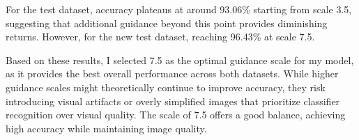 \documentclass[a4paper,twocolumn]{article}
\begin{document}
For the test dataset, accuracy plateaus at around 93.06\% starting from scale 3.5, suggesting that additional guidance beyond this point provides diminishing returns. However, for the new test dataset, reaching 96.43\% at scale 7.5.

Based on these results, I selected 7.5 as the optimal guidance scale for my model, as it provides the best overall performance across both datasets. While higher guidance scales might theoretically continue to improve accuracy, they risk introducing visual artifacts or overly simplified images that prioritize classifier recognition over visual quality. The scale of 7.5 offers a good balance, achieving high accuracy while maintaining image quality.


\printbibliography
\end{document}
